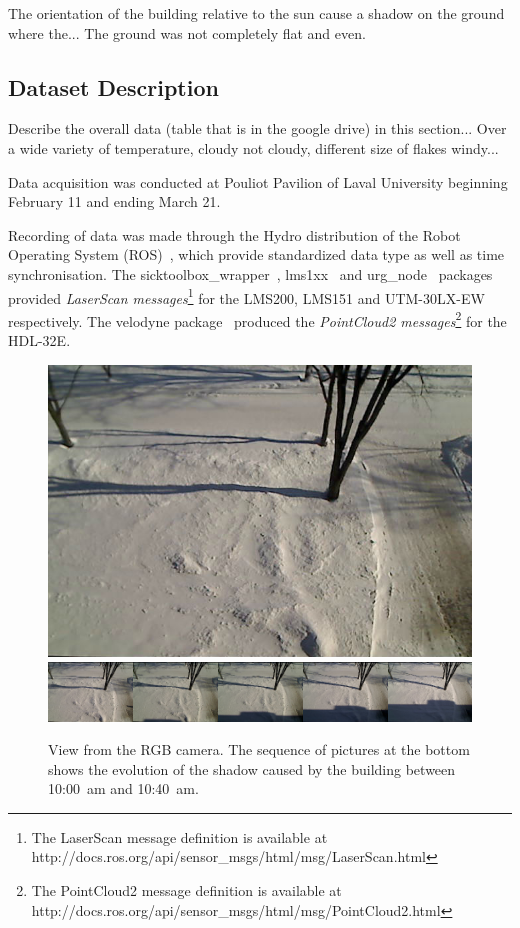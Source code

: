 The orientation of the building relative to the sun cause a shadow on the ground where the... The ground was not completely flat and even.

\subsection{Dataset Description}
Describe the overall data (table that is in the google drive) in this section... Over a wide variety of temperature, cloudy not cloudy, different size of flakes windy...

Data acquisition was conducted at Pouliot Pavilion of Laval University beginning February 11 and ending March 21.

Recording of data was made through the Hydro distribution of the Robot Operating System (ROS)~\cite{ROSWeb}, which provide standardized data type as well as time synchronisation. The sicktoolbox\_wrapper~\cite{LMS200Web}, lms1xx~\cite{LMS151Web} and urg\_node~\cite{HokuyoWeb} packages provided \textit{LaserScan messages}\footnote{The LaserScan message definition is available at http://docs.ros.org/api/sensor\_msgs/html/msg/LaserScan.html} for the LMS200, LMS151 and UTM-30LX-EW respectively. The velodyne package~\cite{VelodyneWeb} produced the \textit{PointCloud2 messages}\footnote{The PointCloud2 message definition is available at http://docs.ros.org/api/sensor\_msgs/html/msg/PointCloud2.html} for the HDL-32E.

\begin{figure}[h]
    \centering
    \includegraphics[width=0.90\linewidth]{./img/camera_view.jpg}
    \includegraphics[width=0.95\linewidth]{./img/shadow2.png}
    \caption{View from the RGB camera. The sequence of pictures at the bottom shows the evolution of the shadow caused by the building between 10:00~am and 10:40~am.}
    \label{fig:setup}
\end{figure}

